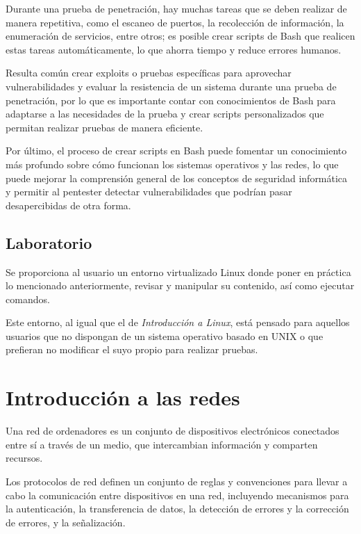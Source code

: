             Durante una prueba de penetración, hay muchas tareas que se deben realizar de manera repetitiva, como el escaneo de puertos, la recolección de información, la enumeración de servicios, entre otros; es posible crear scripts de Bash que realicen estas tareas automáticamente, lo que ahorra tiempo y reduce errores humanos.

            Resulta común crear exploits o pruebas específicas para aprovechar vulnerabilidades y evaluar la resistencia de un sistema durante una prueba de penetración, por lo que es importante contar con conocimientos de Bash para adaptarse a las necesidades de la prueba y crear scripts personalizados que permitan realizar pruebas de manera eficiente.

            Por último, el proceso de crear scripts en Bash puede fomentar un conocimiento más profundo sobre cómo funcionan los sistemas operativos y las redes, lo que puede mejorar la comprensión general de los conceptos de seguridad informática y permitir al pentester detectar vulnerabilidades que podrían pasar desapercibidas de otra forma.

        \subsection{Laboratorio}

            Se proporciona al usuario un entorno virtualizado Linux donde poner en práctica lo mencionado anteriormente, revisar y manipular su contenido, así como ejecutar comandos.

            Este entorno, al igual que el de \textit{Introducción a Linux}, está pensado para aquellos usuarios que no dispongan de un sistema operativo basado en UNIX o que prefieran no modificar el suyo propio para realizar pruebas.


    \section{Introducción a las redes}

        Una red de ordenadores es un conjunto de dispositivos electrónicos conectados entre sí a través de un medio, que intercambian información y comparten recursos.
            
        Los protocolos de red definen un conjunto de reglas y convenciones para llevar a cabo la comunicación entre dispositivos en una red, incluyendo mecanismos para la autenticación, la transferencia de datos, la detección de errores y la corrección de errores, y la señalización.

